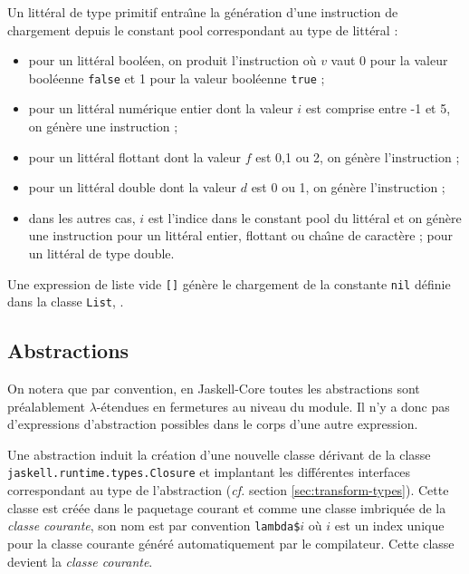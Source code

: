 Un litt\'eral de type primitif entra\^{\i}ne  la g\'en\'eration
d'une instruction de chargement depuis le constant pool correspondant
au type de litt\'eral :
\begin{itemize}
  \item pour un litt\'eral bool\'een, on produit l'instruction
     o\`u $v$ vaut 0 pour la valeur bool\'eenne
    \texttt{false} et 1 pour la valeur bool\'eenne \texttt{true} ;
  \item pour un litt\'eral num\'erique entier dont la valeur $i$ est comprise
    entre -1 et 5, on g\'en\`ere une instruction
     ;
  \item pour un litt\'eral flottant dont la valeur $f$ est 0,1 ou 2, on
    g\'en\`ere l'instruction  ;
  \item pour un litt\'eral double dont la valeur $d$ est 0 ou 1, on
    g\'en\`ere l'instruction  ;
  \item dans les autres cas, $i$ est l'indice dans le constant pool du
    litt\'eral et on g\'en\`ere une instruction  pour
    un litt\'eral entier, flottant ou cha\^{\i}ne de caract\`ere ;  pour
    un litt\'eral de type double. 
\end{itemize}

Une expression de liste vide  \texttt{[]} g\'en\`ere le chargement de la
constante   \texttt{nil} d\'efinie dans la classe \texttt{List},
.

\subsection{Abstractions}

On notera que par convention, en Jaskell-Core toutes les abstractions
sont pr\'ealablement $\lambda$-\'etendues en fermetures au niveau du module. Il n'y a
donc pas d'expressions d'abstraction possibles dans le corps d'une
autre expression.  

Une abstraction induit la cr\'eation d'une nouvelle classe d\'erivant de
la classe \texttt{jaskell.runtime.types.Closure} et implantant les
diff\'erentes interfaces correspondant au type de l'abstraction
(\emph{cf.} section \ref{sec:transform-types}). Cette classe est cr\'e\'ee
dans le paquetage courant et comme une classe imbriqu\'ee de la
\emph{classe courante}, son nom est par convention
\texttt{lambda\$}$i$ o\`u $i$ est un index unique pour la classe
courante g\'en\'er\'e automatiquement par le compilateur. Cette classe
devient la \emph{classe courante}.

